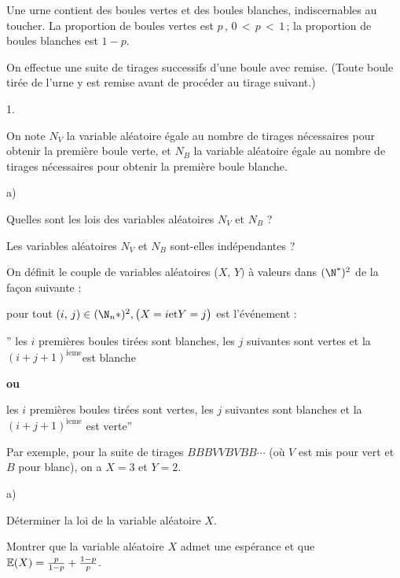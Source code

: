 \documentclass[11pt]{article}%
\begin{document}
Une urne contient des boules vertes et des boules blanches,
indiscernables
au toucher. La proportion de boules vertes est $p\,$, $0\, <\, p\, <\,
1\,$;
la proportion de boules blanches est $1-p$.

On effectue une suite de tirages successifs d'une boule avec
remise. (Toute boule tirée de l'urne y est remise avant de procéder au
tirage suivant.)

\begin{noliste}{1.}
 \setlength{\itemsep}{4mm}
\item On note $N_{V}$ la variable aléatoire égale au nombre de
tirages nécessaires pour obtenir la première boule verte, et $N_{B}$
la variable aléatoire égale au nombre de tirages nécessaires
pour obtenir la première boule blanche.

\begin{noliste}{a)}
 \setlength{\itemsep}{2mm}
\item Quelles sont les lois des variables aléatoires $N_{V}$ et $N_{B}$
 ?

\item Les variables aléatoires $N_{V}$ et $N_{B}$ sont-elles
indépendantes ?
\end{noliste}

On définit le couple de variables aléatoires ($X,\,Y)$ à
valeurs dans $(\N^{*})^{2}$ de la façon suivante :

pour tout $(i,\,j)\in (\N_{n}{*})^{2},\big(X = i\mathrm{et}Y = j\big)$
est l'événement :

'' les $i$ premières boules tirées sont blanches, les $j$ suivantes
sont vertes et la $(i + j + 1)^{\mathrm{ieme}}$est blanche

\textbf{ou}

les $i$ premières boules tirées sont vertes, les $j$ suivantes sont
blanches et la $(i + j + 1)^{\mathrm{ieme}}$ est verte'' 



Par exemple, pour la suite de tirages $BBBVVBVBB\cdots $ (où $V$ est
mis
pour vert et $B$ pour blanc), on a $X = 3$ et $Y = 2$.

\item 
\begin{noliste}{a)}
 \setlength{\itemsep}{2mm}
\item Déterminer la loi de la variable aléatoire $X$.

\item Montrer que la variable aléatoire $X$ admet une espérance et
que $\mathbb{E}(X) = \frac{p}{1-p} + \frac{1-p}{p}$.


\end{noliste}
\end{noliste}
\end{document}
